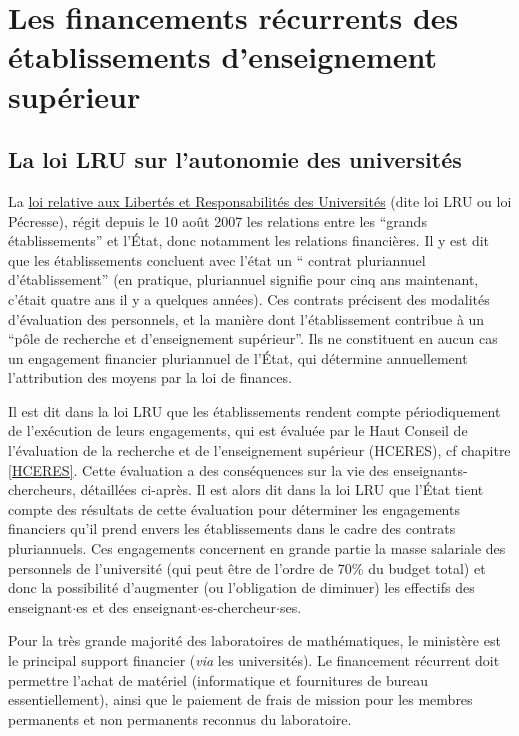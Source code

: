 \chapter[Les financements r\'ecurrents]{Les financements r\'ecurrents des \'etablissements d'enseignement sup\'erieur}


\section{La loi LRU sur l'autonomie des universit\'es}
\label{sec. quad}

La  \href{www.legifrance.gouv.fr/affichTexte.do?cidTexte=JORFTEXT000000824315}{loi relative aux Libert\'es et Responsabilit\'es des Universit\'es}
(dite loi LRU ou loi P\'ecresse), r\'egit depuis le 10 ao\^ut 2007 les relations 
entre les ``grands \'etablissements'' et l'\'Etat, donc notamment les relations financi\`eres. Il y est dit que les \'etablissements 
concluent avec l'\'etat un `` contrat pluriannuel d'\'etablissement'' (en pratique, pluriannuel signifie pour cinq ans maintenant, 
c'\'etait quatre ans il y a quelques ann\'ees). Ces contrats pr\'ecisent des modalit\'es d'\'evaluation des personnels, et la mani\`ere dont 
l'\'etablissement contribue \`a un ``p\^ole de recherche et d'enseignement sup\'erieur''. Ils ne constituent en aucun cas un engagement financier 
pluriannuel de l'\'Etat, qui d\'etermine annuellement l'attribution des moyens par la loi de finances.

Il est dit dans la loi LRU que les \'etablissements rendent compte p\'eriodiquement de l'ex\'ecution de leurs engagements, 
qui est \'evalu\'ee par le Haut Conseil de l'\'evaluation de la recherche et de l'enseignement sup\'erieur (HCERES), cf chapitre \ref{HCERES}. 
Cette évaluation a des cons\'equences sur la vie des enseignants-chercheurs, d\'etaill\'ees ci-apr\`es. Il est alors dit dans la loi LRU que 
l'\'Etat tient compte des r\'esultats de cette \'evaluation pour d\'eterminer 
les engagements financiers qu'il prend envers les \'etablissements dans le cadre des contrats pluriannuels.
Ces engagements concernent en grande partie la masse salariale des personnels de l'universit\'e 
(qui peut \^etre de l'ordre de 70\% du budget total) et donc la possibilit\'e d'augmenter (ou l'obligation de diminuer) 
les effectifs des enseignant$\cdot$es et des enseignant$\cdot$es-chercheur$\cdot$ses.

Pour la tr\`es grande majorit\'e des laboratoires de math\'ematiques,
le minist\`ere est le principal support
financier (\emph{via} les universit\'es).
Le financement r\'ecurrent doit permettre l'achat de mat\'eriel
(informatique et fournitures de bureau essentiellement), ainsi que
le paiement de frais de mission pour les membres permanents et non
permanents reconnus du laboratoire.

